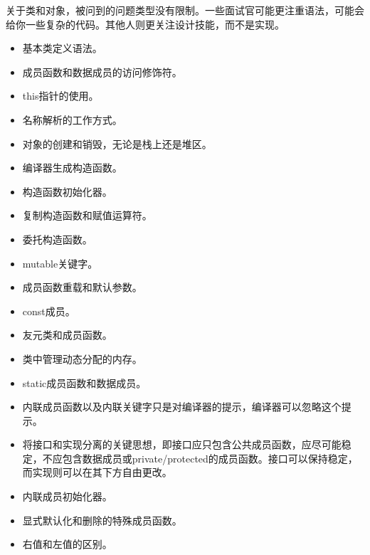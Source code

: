 
关于类和对象，被问到的问题类型没有限制。一些面试官可能更注重语法，可能会给你一些复杂的代码。其他人则更关注设计技能，而不是实现。


\begin{itemize}
\item
基本类定义语法。

\item
成员函数和数据成员的访问修饰符。

\item
this指针的使用。

\item
名称解析的工作方式。

\item
对象的创建和销毁，无论是栈上还是堆区。

\item
编译器生成构造函数。

\item
构造函数初始化器。

\item
复制构造函数和赋值运算符。

\item
委托构造函数。

\item
mutable关键字。

\item
成员函数重载和默认参数。

\item
const成员。

\item
友元类和成员函数。

\item
类中管理动态分配的内存。

\item
static成员函数和数据成员。

\item
内联成员函数以及内联关键字只是对编译器的提示，编译器可以忽略这个提示。

\item
将接口和实现分离的关键思想，即接口应只包含公共成员函数，应尽可能稳定，不应包含数据成员或private/protected的成员函数。接口可以保持稳定，而实现则可以在其下方自由更改。

\item
内联成员初始化器。

\item
显式默认化和删除的特殊成员函数。

\item
右值和左值的区别。


\end{itemize}
